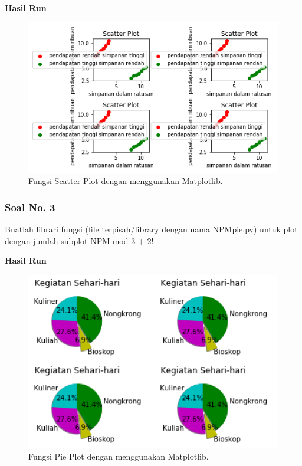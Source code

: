 

\hfill \break
\textbf{Hasil Run}

\begin{figure}[H]
	\includegraphics[width=12cm]{figures/6/1144124/b.png}
	\centering
	\caption{Fungsi Scatter Plot dengan menggunakan Matplotlib.}
\end{figure}

\subsubsection{Soal No. 3}
\hfill \break
Buatlah librari fungsi (file terpisah/library dengan nama NPMpie.py) untuk plot dengan jumlah subplot NPM mod 3 + 2!



\hfill \break
\textbf{Hasil Run}

\begin{figure}[H]
	\includegraphics[width=12cm]{figures/6/1144124/c.png}
	\centering
	\caption{Fungsi Pie Plot dengan menggunakan Matplotlib.}
\end{figure}

